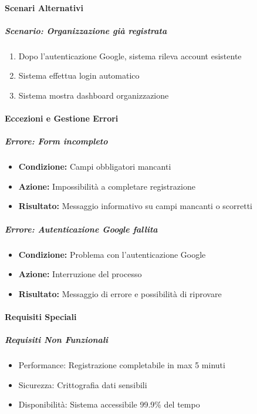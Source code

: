 \paragraph{Scenari Alternativi}

\subparagraph{Scenario: Organizzazione già registrata}
\begin{enumerate}
\item Dopo l'autenticazione Google, sistema rileva account esistente
\item Sistema effettua login automatico
\item Sistema mostra dashboard organizzazione
\end{enumerate}

\paragraph{Eccezioni e Gestione Errori}

\subparagraph{Errore: Form incompleto}
\begin{itemize}
\item \textbf{Condizione:} Campi obbligatori mancanti
\item \textbf{Azione:} Impossibilità a completare registrazione
\item \textbf{Risultato:} Messaggio informativo su campi mancanti o scorretti
\end{itemize}

\subparagraph{Errore: Autenticazione Google fallita}
\begin{itemize}
\item \textbf{Condizione:} Problema con l'autenticazione Google
\item \textbf{Azione:} Interruzione del processo
\item \textbf{Risultato:} Messaggio di errore e possibilità di riprovare
\end{itemize}

\paragraph{Requisiti Speciali}

\subparagraph{Requisiti Non Funzionali}
\begin{itemize}
\item Performance: Registrazione completabile in max 5 minuti
\item Sicurezza: Crittografia dati sensibili
\item Disponibilità: Sistema accessibile 99.9\% del tempo
\end{itemize}

